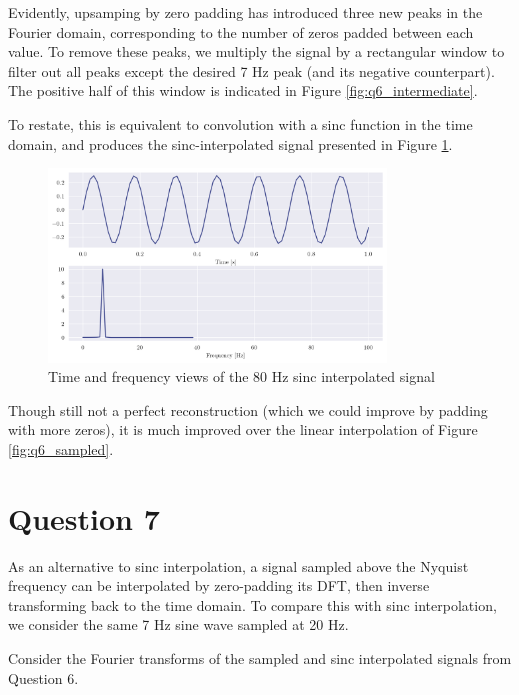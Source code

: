 \documentclass[a4paper, 11pt]{article}
\begin{document}
Evidently, upsamping by zero padding has introduced three new peaks in the
Fourier domain, corresponding to the number of zeros padded between each value.
To remove these peaks, we multiply the signal by a rectangular window to filter
out all peaks except the desired 7 Hz peak (and its negative counterpart). The
positive half of this window is indicated in Figure \ref{fig:q6_intermediate}.

To restate, this is equivalent to convolution with a sinc function in the time
domain, and produces the sinc-interpolated signal presented in Figure
\ref{fig:q6_upsampled}.

\begin{figure}[ht]
    \centering
    \includegraphics[width=0.8\textwidth]{images/q6_upsampled.png}
    \caption{Time and frequency views of the 80 Hz sinc interpolated signal}
    \label{fig:q6_upsampled}
\end{figure}

Though still not a perfect reconstruction (which we could improve by padding with more
zeros), it is much improved over the linear interpolation of Figure
\ref{fig:q6_sampled}.

\newpage
\section*{Question 7}

As an alternative to sinc interpolation, a signal sampled above the Nyquist
frequency can be interpolated by zero-padding its DFT, then inverse transforming
back to the time domain. To compare this with sinc interpolation, we consider
the same 7 Hz sine wave sampled at 20 Hz.

Consider the Fourier transforms of the sampled and sinc interpolated signals
from Question 6.
\end{document}
